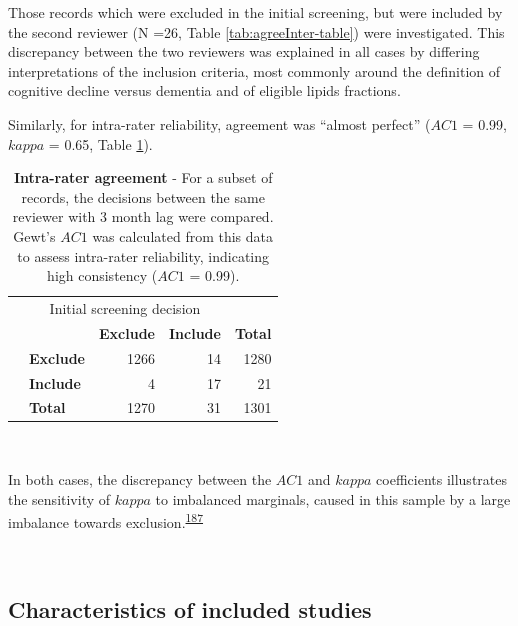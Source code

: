 \documentclass[a4paper, twoside]{templates/ociamthesis}
\begin{document}
Those records which were excluded in the initial screening, but were included by the second reviewer (N =26, Table \ref{tab:agreeInter-table}) were investigated. This discrepancy between the two reviewers was explained in all cases by differing interpretations of the inclusion criteria, most commonly around the definition of cognitive decline versus dementia and of eligible lipids fractions.

Similarly, for intra-rater reliability, agreement was ``almost perfect'' (\(AC1\) = 0.99, \(kappa\) = 0.65, Table \ref{tab:agreeIntra-table}).





\begin{table}[H]

\caption[Inter-rater agreement]{\label{tab:agreeIntra-table}\textbf{Intra-rater agreement} - For a subset of records, the decisions between the same reviewer with 3 month lag were compared. Gewt's \(AC1\) was calculated from this data to assess intra-rater reliability, indicating high consistency (\(AC1\) = 0.99).}
\centering
\begin{tabular}[t]{>{\raggedright\arraybackslash}p{12em}>{}lr>{}r|r}
\toprule
\multicolumn{2}{c}{ } & \multicolumn{3}{c}{Initial screening decision} \\
\cmidrule(l{3pt}r{3pt}){3-5}
\textbf{} & \textbf{} & \textbf{Exclude} & \textbf{Include} & \textbf{Total}\\
\midrule
 & \textbf{Exclude} & 1266 & 14 & 1280\\
\cmidrule{2-5}
 & \textbf{Include} & 4 & 17 & 21\\
\cmidrule{2-5}
\multirow{-3}{12em}{\raggedright\arraybackslash \textbf{Same reviewer decision (with 3 month lag)}} & \textbf{Total} & 1270 & 31 & 1301\\
\bottomrule
\end{tabular}
\end{table}

~

In both cases, the discrepancy between the \(AC1\) and \(kappa\) coefficients illustrates the sensitivity of \(kappa\) to imbalanced marginals, caused in this sample by a large imbalance towards exclusion.\textsuperscript{\protect\hyperlink{ref-feinstein1990}{187}}

~

\hypertarget{sys-rev-characteristics}{%
\subsection{Characteristics of included studies}\label{sys-rev-characteristics}}
\end{document}
